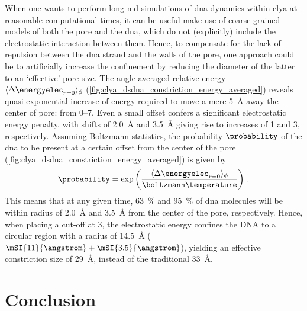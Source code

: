 
When one wants to perform long \gls{md} simulations of \gls{dna} dynamics within \gls{clya} at reasonable
computational times, it can be useful make use of coarse-grained models of both the pore and the \gls{dna},
which do not (explicitly) include the electrostatic interaction between them. Hence, to compensate for the
lack of repulsion between the \gls{dna} strand and the walls of the pore, one approach could be to
artificially increase the confinement by reducing the diameter of the latter to an `effective' pore size.
The angle-averaged relative energy $\langle \Delta \energyelec_{r=0} \rangle_{\phi}$
(\cref{fig:clya_dsdna_constriction_energy_averaged}) reveals quasi exponential increase of energy required to
move a mere \SI{5}{\angstrom} away the center of pore: from \SIrange{0}{7}{\kT}. Even a small offset confers a
significant electrostatic energy penalty, with shifts of \SI{2.0}{\angstrom} and \SI{3.5}{\angstrom} giving
rise to increases of \SI{1}{\kT} and \SI{3}{\kT}, respectively. Assuming Boltzmann statistics, the probability
$\probability$ of the \gls{dna} to be present at a certain offset from the center of the pore
(\cref{fig:clya_dsdna_constriction_energy_averaged}) is given by 
%
\begin{align}\label{eq:electrostatics_probability}
  \probability = \exp{
    \left( \dfrac{\langle \Delta \energyelec_{r=0} \rangle_{\phi}}{\boltzmann\temperature} \right)
    }
    \text{  .}
\end{align}
%
This means that at any given time, \SI{63}{\percent} and \SI{95}{\percent} of \gls{dna} molecules will be
within radius of \SI{2.0}{\angstrom} and \SI{3.5}{\angstrom} from the center of the pore, respectively. Hence,
when placing a cut-off at \SI{3}{\kT}, the electrostatic energy confines the DNA to a circular region with a
radius of \SI{14.5}{\angstrom} ($\mSI{11}{\angstrom} + \mSI{3.5}{\angstrom}$), yielding an effective
constriction size of \SI{29}{\angstrom}, instead of the traditional \SI{33}{\angstrom}.


\section{Conclusion}
%
\label{sec:elec:conclusion}
%

